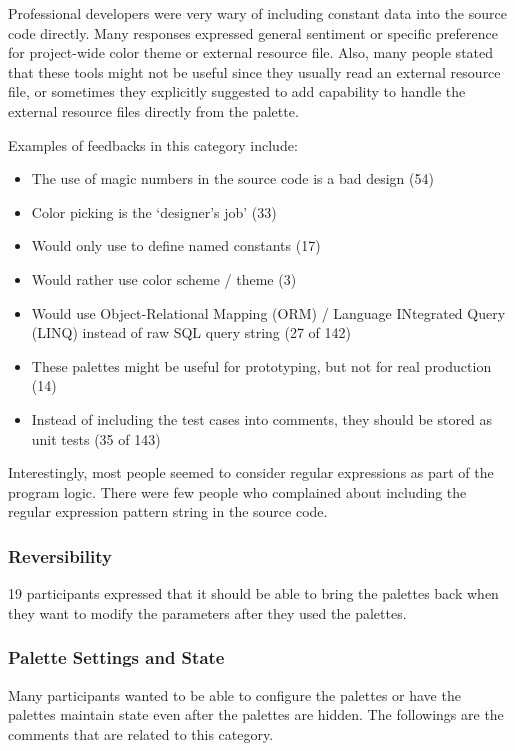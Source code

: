 \documentclass[conference]{IEEEtran}
\begin{document}
Professional developers were very wary of including constant data into the source code directly. Many responses expressed general sentiment or specific preference for project-wide color theme or external resource file. Also, many people stated that these tools might not be useful since they usually read an external resource file, or sometimes they explicitly suggested to add capability to handle the external resource files directly from the palette.

Examples of feedbacks in this category include:

\begin{itemize}
	\item The use of magic numbers in the source code is a bad design (54)
	\item Color picking is the `designer's job' (33)
	\item Would only use to define named constants (17)
	\item Would rather use color scheme / theme (3)
	\item Would use Object-Relational Mapping (ORM) / Language INtegrated Query (LINQ) instead of raw SQL query string (27 of 142)
	\item These palettes might be useful for prototyping, but not for real production (14)
	\item Instead of including the test cases into comments, they should be stored as unit tests (35 of 143)
\end{itemize}

Interestingly, most people seemed to consider regular expressions as part of the program logic. There were few people who complained about including the regular expression pattern string in the source code.
 
\subsubsection{Reversibility}

19 participants expressed that it should be able to bring the palettes back when they want to modify the parameters after they used the palettes.
 
\subsubsection{Palette Settings and State}

Many participants wanted to be able to configure the palettes or have the palettes maintain state even after the palettes are hidden. The followings are the comments that are related to this category.
\end{document}

